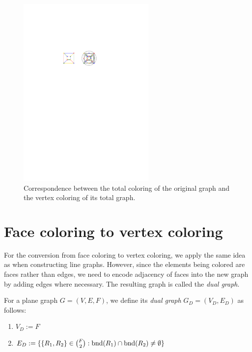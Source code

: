 \begin{figure}[H]
    \centering
    \includegraphics[width=0.6\textwidth]{../Resources/Figs/cubical_tot_g_clring_opt.pdf}
    \caption{Correspondence between the total coloring of the original graph and the vertex coloring of its total graph.}
    \label{fig:cubical_tot_g_clring}
\end{figure}

\section{Face coloring to vertex coloring}

For the conversion from face coloring to vertex coloring, we apply the same idea as when constructing line graphs. However, since the elements being colored are faces rather than edges, we need to encode adjacency of faces into the new graph by adding edges where necessary. The resulting graph is called the \textit{dual graph}.

\begin{defn}
    For a plane graph $G = (V, E, F)$, we define its \emph{dual graph} $G_D = (V_D, E_D)$ as follows:
    \begin{enumerate}
        \item $V_D := F$
        \item $E_D := \{ \{R_1, R_2\} \in \binom{F}{2} : \operatorname{bnd}(R_1) \cap \operatorname{bnd}(R_2) \neq \emptyset \}$
    \end{enumerate}
\end{defn}

